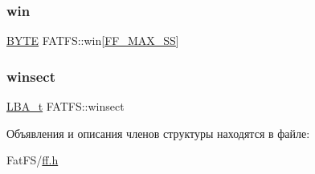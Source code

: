 \mbox{\label{struct_f_a_t_f_s_a49e9c5c3ae9c13755242b6ce5748ecb1}} 
\subsubsection{\texorpdfstring{win}{win}}
{\footnotesize\ttfamily \mbox{\hyperlink{ff_8h_a4ae1dab0fb4b072a66584546209e7d58}{B\+Y\+TE}} F\+A\+T\+F\+S\+::win\mbox{[}\mbox{\hyperlink{ffconf_8h_a104c36ee46f9d6e76dadf37f3d9696cc}{F\+F\+\_\+\+M\+A\+X\+\_\+\+SS}}\mbox{]}}

\mbox{\label{struct_f_a_t_f_s_aaf7eccaccdc9c4243230672d6b2f6566}} 
\subsubsection{\texorpdfstring{winsect}{winsect}}
{\footnotesize\ttfamily \mbox{\hyperlink{ff_8h_a1f3c30a83148a28340f009d4e583f087}{L\+B\+A\+\_\+t}} F\+A\+T\+F\+S\+::winsect}



Объявления и описания членов структуры находятся в файле\+:\begin{DoxyCompactItemize}
\item 
Fat\+F\+S/\mbox{\hyperlink{ff_8h}{ff.\+h}}\end{DoxyCompactItemize}
